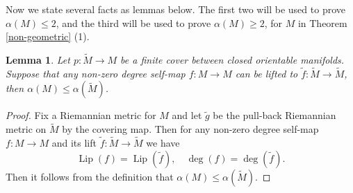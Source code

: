 \documentclass{amsart}
\newcommand{\ra}{\rightarrow}
\newcommand{\lip}{\operatorname{Lip}}
\newtheorem{lem}[thm]{Lemma}
\begin{document}

Now we state several facts as lemmas below. The first two will be used to prove $\alpha(M)\le 2$, and the third will be used to
prove $\alpha(M)\ge 2$, for $M$ in Theorem \ref{non-geometric} (1).


\begin{lem}\label{LiftingUpperBoundsExponent}
    Let $p:\tilde M\ra M$ be a finite cover between closed orientable manifolds. Suppose that any non-zero degree self-map $f:M\ra M$ can be lifted to $\tilde f :\tilde M\ra \tilde M$, then $\alpha(M)\leqslant\alpha(\tilde M)$.
\end{lem}
\begin{proof}
     Fix a Riemannian metric for $M$ and let $\tilde g$ be the pull-back Riemannian metric on $\tilde M$ by the covering map. Then for any non-zero degree self-map $f:M\ra M$ and its lift $\tilde f :\tilde M\ra \tilde M$ we have
     \[
        \lip (f)=\lip (\tilde f),\quad \deg (f)=\deg(\tilde f).
     \]
     Then it follows from the definition that $\alpha(M)\leqslant \alpha(\tilde M)$.
\end{proof}

\end{document}

